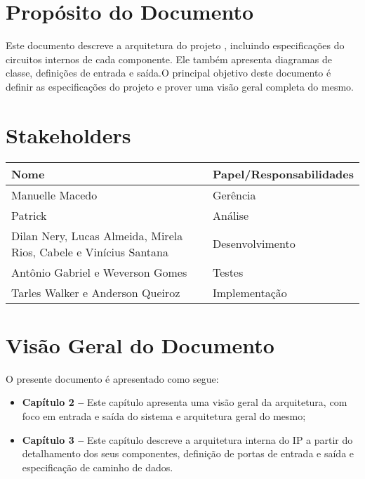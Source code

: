   \section{Propósito do Documento}
  Este documento descreve a arquitetura do projeto \ipPROCESSProject, incluindo especificações do circuitos internos de cada componente. Ele também apresenta diagramas de classe, definições de entrada e saída.O principal objetivo deste documento é definir as especificações do projeto \ipPROCESSProject e prover uma visão geral completa do mesmo.

  \section{Stakeholders}
    \FloatBarrier
    \begin{table}[H] 
      \begin{center}
        \begin{tabular}[pos]{|m{6cm} | m{8cm}|} 
          \hline 
          \cellcolor[gray]{0.9}\textbf{Nome} & \cellcolor[gray]{0.9}\textbf{Papel/Responsabilidades} \\  
           \hline Manuelle Macedo 	& Gerência \\
           \hline Patrick 	& Análise \\
           \hline Dilan Nery, Lucas Almeida, Mirela Rios, Cabele e Vinícius Santana	& Desenvolvimento \\
           \hline Antônio Gabriel e Weverson Gomes	& Testes       \\
           \hline Tarles Walker e Anderson Queiroz 	& Implementação \\ \hline
        \end{tabular}
      \end{center}
    \end{table} 

\section{Visão Geral do Documento}

O presente documento é apresentado como segue:

  \begin{itemize}
   \item \textbf{Capítulo 2 --} Este capítulo apresenta uma visão geral da arquitetura, com foco em entrada e saída do sistema e arquitetura geral do mesmo;
   \item \textbf{Capítulo 3 --} Este capítulo descreve a arquitetura interna do IP a partir do detalhamento dos seus componentes, definição de portas de entrada e saída e especificação de caminho de dados.
  \end{itemize}



